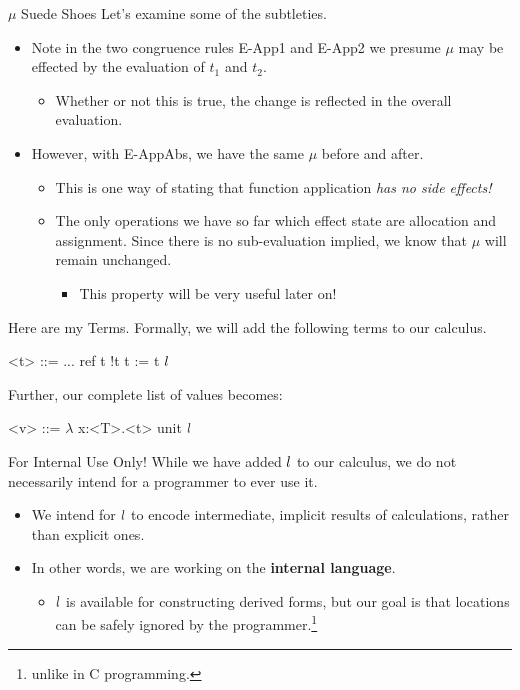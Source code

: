 \documentclass[11pt]{beamer}
\begin{document}
\begin{frame}[fragile=singleslide]{$\mu$ Suede Shoes}
Let's examine some of the subtleties.
\begin{itemize}
\item Note in the two congruence rules E-App1 and E-App2 we presume $\mu$ may be effected by the evaluation of $t_1$ and $t_2$.  
\begin{itemize}
\item Whether or not this is true, the change is reflected in the overall evaluation.
\end{itemize}
\item However, with E-AppAbs, we have the same $\mu$ before and after.
\begin{itemize}
\item This is one way of stating that function application \emph{has no side effects!}
\item The only operations we have so far which effect state are allocation and assignment.  Since there is no sub-evaluation implied, we know that $\mu$ will remain unchanged.
\begin{itemize}
\item This property will be very useful later on! 
\end{itemize}
\end{itemize}
\end{itemize}
\end{frame}


\begin{frame}[fragile=singleslide]{Here are my Terms.}
Formally, we will add the following terms to our calculus.

\begin{grammar}
<t> ::= ...
\alt ref t
\alt !t
\alt t := t
\alt $\mathnormal{l}$
\end{grammar}
Further, our complete list of values becomes: 
\begin{grammar}
<v> ::= $\lambda$ x:<T>.<t>
\alt unit
\alt $\mathnormal{l}$

\end{grammar}
\end{frame}

\begin{frame}[fragile=singleslide]{For Internal Use Only!}
While we have added $\mathnormal{l}$ to our calculus, we do not necessarily intend for a programmer to ever use it.
\begin{itemize}
\item We intend for $\mathnormal{l}$ to encode intermediate, implicit results of calculations, rather than explicit ones.
\item In other words, we are working on the \textbf{internal language}.  
\begin{itemize}
\item $\mathnormal{l}$ is available for constructing derived forms, but our goal is that locations can be safely ignored by the programmer.\footnote{unlike in C programming.}
\end{itemize}
\end{itemize}
\end{frame}
\end{document}
